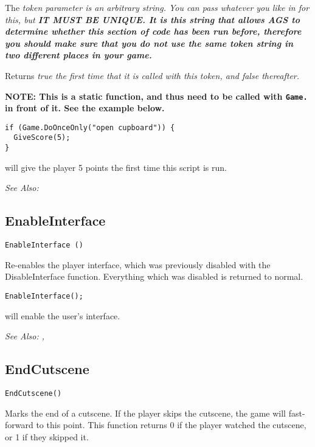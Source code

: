 The \it{token} parameter is an arbitrary string. You can pass whatever you like in
for this, but \bf{IT MUST BE UNIQUE}. It is this string that allows AGS to determine
whether this section of code has been run before, therefore you should make sure
that \bf{you do not use the same token string in two different places in your game}.

Returns \it{true} the first time that it is called with this token, and \it{false} thereafter.

\bf{NOTE:} This is a static function, and thus need to be called with \verb$Game.$ in front of it. See
the example below.

\begin{verbatim}
if (Game.DoOnceOnly("open cupboard")) {
  GiveScore(5);
}
\end{verbatim}
will give the player 5 points the first time this script is run.

\it{See Also:} 


\subsection{EnableInterface}\label{EnableInterface}%

\begin{verbatim}
EnableInterface ()
\end{verbatim}
Re-enables the player interface, which was previously disabled with
the DisableInterface function. Everything which was disabled is returned
to normal.

\begin{verbatim}
EnableInterface();
\end{verbatim}
will enable the user's interface.

\it{See Also:} , 


\subsection{EndCutscene}\label{EndCutscene}%

\begin{verbatim}
EndCutscene()
\end{verbatim}

Marks the end of a cutscene. If the player skips the cutscene, the game will
fast-forward to this point. This function returns 0 if the player watched the cutscene,
or 1 if they skipped it.

